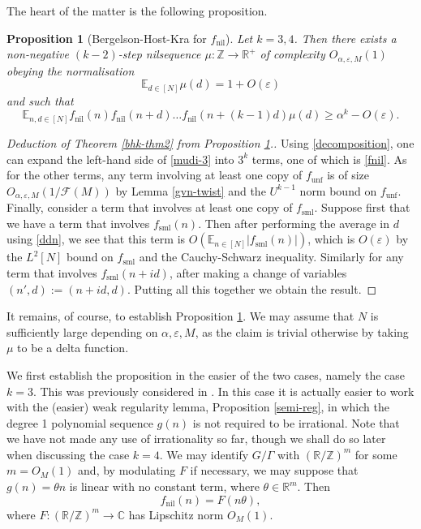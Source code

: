 \documentclass[11pt,reqno]{amsart}
\numberwithin{equation}{section}
\theoremstyle{plain}
\newtheorem{proposition}[subsection]{Proposition}
\theoremstyle{definition}
\renewcommand{\geq}{\geqslant}
\newcommand\E{{\mathbb{E}}}
\newcommand\Z{\mathbb{Z}}
\newcommand\R{\mathbb{R}}
\newcommand\C{\mathbb{C}}
\newcommand\1{{\bf 1}}
\newcommand\2{{\bf 2}}
\newcommand\eps{\varepsilon}
\newcommand\nil{{\operatorname{nil}}}
\newcommand\sml{{\operatorname{sml}}}
\newcommand\unf{{\operatorname{unf}}}
\newcommand\Grow{{\mathcal F}}
\begin{document}
The heart of the matter is the following proposition.

\begin{proposition}[Bergelson-Host-Kra for $f_\nil$]\label{bhk-prop}  Let $k=3,4$.  Then there exists a non-negative $(k-2)$-step nilsequence $\mu: \Z \to \R^+$ of complexity $O_{\alpha,\eps,M}(1)$ obeying the normalisation
\begin{equation}\label{ddn}
\E_{d \in [N]} \mu(d) = 1 + O(\eps)
\end{equation}
and such that
\begin{equation}\label{fnil}
 \E_{n,d \in [N]}  f_\nil(n) f_\nil(n+d) \ldots f_\nil(n+(k-1)d)\mu(d)  \geq \alpha^k - O( \eps).
\end{equation}
\end{proposition}

\begin{proof}[Deduction of Theorem \ref{bhk-thm2} from Proposition \ref{bhk-prop}.]  Using \eqref{decomposition}, one can expand the left-hand side of \eqref{mudi-3} into $3^k$ terms, one of which is \eqref{fnil}.  As for the other terms, any term involving at least one copy of $f_\unf$ is of size $O_{\alpha,\eps,M}(1/\Grow(M))$ by Lemma \ref{gvn-twist} and the $U^{k-1}$ norm bound on $f_\unf$.  Finally, consider a term that involves at least one copy of $f_\sml$.  Suppose first that we have a term that involves $f_\sml(n)$.  Then after performing the average in $d$ using \eqref{ddn}, we see that this term is $O( \E_{n \in [N]} |f_\sml(n)|)$, which is $O(\eps)$ by the $L^2[N]$ bound on $f_\sml$ and the Cauchy-Schwarz inequality.  Similarly for any term that involves $f_\sml(n+id)$, after making a change of variables $(n',d) := (n+id,d)$.  Putting all this together we obtain the result. 
\end{proof}

It remains, of course, to establish Proposition \ref{bhk-prop}.  We may assume that $N$ is sufficiently large depending on $\alpha,\eps,M$, as the claim is trivial otherwise by taking $\mu$ to be a delta function.

We first establish the proposition in the easier of the two cases, namely the case $k=3$. This was previously considered in \cite{green-regularity}.  In this case it is actually easier to work with the (easier) weak regularity lemma, Proposition \ref{semi-reg}, in which the degree 1 polynomial sequence $g(n)$ is not required to be irrational. Note that we have not made any use of irrationality so far, though we shall do so later when discussing the case $k = 4$. We may identify $G/\Gamma$ with $(\R/\Z)^m$ for some $m = O_M(1)$ and, by modulating $F$ if necessary, we may suppose that $g(n) = \theta n$ is linear with no constant term, where $\theta \in \R^m$. Then $$ f_\nil(n) = F( n \theta ),$$ where $ F: (\R/\Z)^m \to \C$ has Lipschitz norm $O_M(1)$.  
\end{document}
